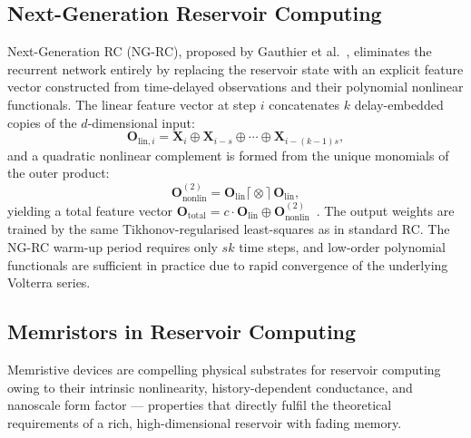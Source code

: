 \documentclass[11pt, oneside]{article}
\begin{document}
\subsection{Next-Generation Reservoir Computing}
 
Next-Generation RC (NG-RC), proposed by Gauthier et al.~\autocite{Gauthier2021},
eliminates the recurrent network entirely by replacing the reservoir state with
an explicit feature vector constructed from time-delayed observations and their
polynomial nonlinear functionals.
The linear feature vector at step \(i\) concatenates \(k\) delay-embedded copies
of the \(d\)-dimensional input:
\begin{equation}
  \mathbf{O}_{\mathrm{lin},i}
  = \mathbf{X}_i \oplus \mathbf{X}_{i-s} \oplus \cdots
    \oplus \mathbf{X}_{i-(k-1)s},
  \label{eq:ngrc_linear}
\end{equation}
and a quadratic nonlinear complement is formed from the unique monomials of
the outer product:
\begin{equation}
  \mathbf{O}^{(2)}_{\mathrm{nonlin}}
  = \mathbf{O}_{\mathrm{lin}} \lceil\!\otimes\!\rceil\,
    \mathbf{O}_{\mathrm{lin}},
  \label{eq:ngrc_nonlinear}
\end{equation}
yielding a total feature vector
\(\mathbf{O}_{\mathrm{total}} = c\cdot\mathbf{O}_{\mathrm{lin}}
\oplus \mathbf{O}^{(2)}_{\mathrm{nonlin}}\)~\autocite{Gauthier2021}.
The output weights are trained by the same Tikhonov-regularised
least-squares as in standard RC.
The NG-RC warm-up period requires only \(sk\) time steps, and low-order
polynomial functionals are sufficient in practice due to rapid convergence
of the underlying Volterra series.
 
\subsection{Memristors in Reservoir Computing}
 
Memristive devices are compelling physical substrates for reservoir computing
owing to their intrinsic nonlinearity, history-dependent conductance, and
nanoscale form factor --- properties that directly fulfil the theoretical
requirements of a rich, high-dimensional reservoir with fading memory.
 
\end{document}
